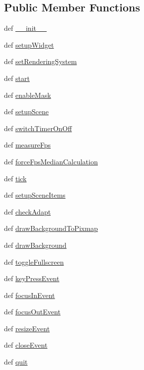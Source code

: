 \subsection*{Public Member Functions}
\begin{DoxyCompactItemize}
\item 
def \hyperlink{classmainwindow_1_1MainWindow_a35715d29ce0d912bcb4492a8f365042a}{\+\_\+\+\_\+init\+\_\+\+\_\+}
\item 
def \hyperlink{classmainwindow_1_1MainWindow_a2f33be5baa48e421cb77522acd402afd}{setup\+Widget}
\item 
def \hyperlink{classmainwindow_1_1MainWindow_a198018db1137d0028dfc798ecf559334}{set\+Rendering\+System}
\item 
def \hyperlink{classmainwindow_1_1MainWindow_af5bae15b5a7eab7f9b726cfe58ad1b77}{start}
\item 
def \hyperlink{classmainwindow_1_1MainWindow_a795928615ac06f9460097486ac239d65}{enable\+Mask}
\item 
def \hyperlink{classmainwindow_1_1MainWindow_a7767b8bc5297297f80069932d21deccf}{setup\+Scene}
\item 
def \hyperlink{classmainwindow_1_1MainWindow_ae49252ce00f2e18354b83eb06c9d28fa}{switch\+Timer\+On\+Off}
\item 
def \hyperlink{classmainwindow_1_1MainWindow_ae632ad9201aae51a653839a8f3133452}{measure\+Fps}
\item 
def \hyperlink{classmainwindow_1_1MainWindow_a995e77e1888df3d4d181715296fa0c82}{force\+Fps\+Median\+Calculation}
\item 
def \hyperlink{classmainwindow_1_1MainWindow_a58123d0d1edbf95e78f6715b02f64102}{tick}
\item 
def \hyperlink{classmainwindow_1_1MainWindow_afc903bc8068b340df035fcbbde219271}{setup\+Scene\+Items}
\item 
def \hyperlink{classmainwindow_1_1MainWindow_ace64562c8e4afa867ea7787d730eaeb8}{check\+Adapt}
\item 
def \hyperlink{classmainwindow_1_1MainWindow_aa320cdfe80251ceaa4c9ea42bdef7748}{draw\+Background\+To\+Pixmap}
\item 
def \hyperlink{classmainwindow_1_1MainWindow_a78d45b9bea5a77d220482de2b385ac4e}{draw\+Background}
\item 
def \hyperlink{classmainwindow_1_1MainWindow_a60cddd281459bd01c02d47ff1ab173f8}{toggle\+Fullscreen}
\item 
def \hyperlink{classmainwindow_1_1MainWindow_a7a13a8622005314b15460e7cc6b68828}{key\+Press\+Event}
\item 
def \hyperlink{classmainwindow_1_1MainWindow_af0078426430bbbd3919755c644fe3766}{focus\+In\+Event}
\item 
def \hyperlink{classmainwindow_1_1MainWindow_a6bd44df99f9a728b4ea3daaabd377f81}{focus\+Out\+Event}
\item 
def \hyperlink{classmainwindow_1_1MainWindow_ae1e88e657e667f61b57ba452e2e220d3}{resize\+Event}
\item 
def \hyperlink{classmainwindow_1_1MainWindow_abe83df72304e9f64d9cb050fab3f3682}{close\+Event}
\item 
def \hyperlink{classmainwindow_1_1MainWindow_a620b1fc3d0b2421b8741d5da413c6d62}{quit}
\end{DoxyCompactItemize}
